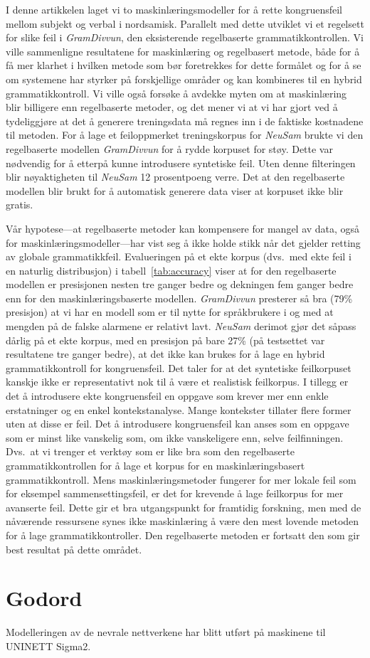 \documentclass{flammie}
\begin{document}
I denne artikkelen laget vi to maskinlæringsmodeller for å rette kongruensfeil
mellom subjekt og verbal i nordsamisk. Parallelt med dette utviklet vi et
regelsett for slike feil i \textit{GramDivvun}, den eksisterende regelbaserte
grammatikkontrollen.  Vi ville sammenligne resultatene for maskinlæring og
regelbasert metode, både for å få mer klarhet i hvilken metode som bør
foretrekkes for dette formålet og for å se om systemene har styrker på
forskjellige områder og kan kombineres til en hybrid grammatikkontroll.  Vi
ville også forsøke å avdekke myten om at maskinlæring blir billigere enn
regelbaserte metoder, og det mener vi at vi har gjort ved å tydeliggjøre at det
å generere treningsdata må regnes inn i de faktiske kostnadene til metoden.  For
å lage et feiloppmerket treningskorpus for \textit{NeuSam} brukte vi den
regelbaserte modellen \textit{GramDivvun} for å rydde korpuset for støy. Dette
var nødvendig for å etterpå kunne introdusere syntetiske feil.  Uten denne
filteringen blir nøyaktigheten til \textit{NeuSam} 12 prosentpoeng verre.  Det
at den regelbaserte modellen blir brukt for å automatisk generere data viser at
korpuset ikke blir gratis.

Vår hypotese---at regelbaserte metoder kan kompensere for mangel av data, også
for maskinlæringsmodeller---har vist seg å ikke holde stikk når det gjelder
retting av globale grammatikkfeil.  Evalueringen på et ekte korpus (dvs.\ med
ekte feil i en naturlig distribusjon) i tabell~\ref{tab:accuracy} viser at for
den regelbaserte modellen er presisjonen nesten tre ganger bedre og dekningen
fem ganger bedre enn for den maskinlæringsbaserte modellen. \textit{GramDivvun}
presterer så bra (79\% presisjon) at vi har en modell som er til nytte for
språkbrukere i og med at mengden på de falske alarmene er relativt lavt.
\textit{NeuSam} derimot gjør det såpass dårlig på et ekte korpus, med en
presisjon på bare 27\% (på testsettet var resultatene tre ganger bedre), at det
ikke kan brukes for å lage en hybrid grammatikkontroll for kongruensfeil.  Det
taler for at det syntetiske feilkorpuset kanskje ikke er representativt nok til
å være et realistisk feilkorpus. I tillegg er det å introdusere ekte
kongruensfeil en oppgave som krever mer enn enkle erstatninger og en enkel
kontekstanalyse. Mange kontekster tillater flere former uten at disse er feil.
Det å introdusere kongruensfeil kan anses som en oppgave som er minst like
vanskelig som, om ikke vanskeligere enn, selve feilfinningen. Dvs.\ at vi
trenger et verktøy som er like bra som den regelbaserte grammatikkontrollen for
å lage et korpus for en maskinlæringsbasert grammatikkontroll.  Mens
maskinlæringsmetoder fungerer for mer lokale feil som for eksempel
sammensettingsfeil, er det for krevende å lage feilkorpus for mer avanserte
feil.  Dette gir et bra utgangspunkt for framtidig forskning, men med de
nåværende ressursene synes ikke maskinlæring å være den mest lovende metoden for
å lage grammatikkontroller. Den regelbaserte metoden er fortsatt den som gir
best resultat på dette området.

\section*{Godord}

Modelleringen av de nevrale nettverkene har blitt utført på maskinene til
UNINETT Sigma2.







\label{lastpage}
\end{document}
